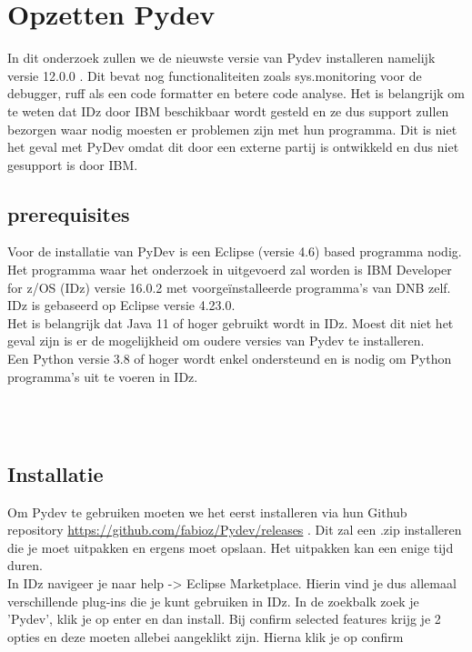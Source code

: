 
\chapter{Opzetten Pydev}
\label{ch:opzetten-pydev}

In dit onderzoek zullen we de nieuwste versie van Pydev installeren namelijk versie 12.0.0 .
Dit bevat nog functionaliteiten zoals sys.monitoring voor de debugger, ruff als een code formatter en betere code analyse. Het is belangrijk om te weten dat IDz door IBM beschikbaar wordt gesteld en ze dus support zullen bezorgen waar nodig moesten er problemen zijn met hun programma. Dit is niet het geval met PyDev omdat dit door een externe partij is ontwikkeld en dus niet gesupport is door IBM. \\
\section{prerequisites}
Voor de installatie van PyDev is een Eclipse (versie 4.6) based programma nodig. Het programma waar het onderzoek in uitgevoerd zal worden is IBM Developer for z/OS (IDz) versie 16.0.2 met voorgeïnstalleerde programma's van DNB zelf. IDz is gebaseerd op Eclipse versie 4.23.0. \\

Het is belangrijk dat Java 11 of hoger gebruikt wordt in IDz. Moest dit niet het geval zijn is er de mogelijkheid om oudere versies van Pydev te installeren. \\

Een Python versie 3.8 of hoger wordt enkel ondersteund en is nodig om Python programma's uit te voeren in IDz.
 
\\
\\
\section{Installatie}
Om Pydev te gebruiken moeten we het eerst installeren via hun Github repository \url{https://github.com/fabioz/Pydev/releases} . Dit zal een .zip installeren die je moet uitpakken en ergens moet opslaan. Het uitpakken kan een enige tijd duren. \\
In IDz navigeer je naar help -> Eclipse Marketplace. Hierin vind je dus allemaal verschillende plug-ins die je kunt gebruiken in IDz. In de zoekbalk zoek je 'Pydev', klik je op enter en dan install. Bij confirm selected features krijg je 2 opties en deze moeten allebei aangeklikt zijn. Hierna klik je op confirm


